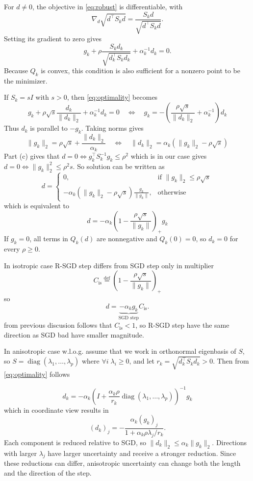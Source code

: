 \documentclass[11pt,a4paper]{article}
\def\eqdef{\overset{\mathrm{def}}{=}}
\begin{document}
For $d\neq 0$, the objective in \eqref{eq:robust} is differentiable, with
\[
    \nabla_d\sqrt{d^\top S_kd}
    =\frac{S_kd}{\sqrt{d^\top S_kd}}.
\]
Setting its gradient to zero gives
\begin{equation}
    g_k+\rho\frac{S_kd_k}{\sqrt{d_k^\top S_kd_k}}
        +\alpha_k^{-1}d_k=0.
    \label{eq:optimality}
\end{equation}
Because $Q_k$ is convex, this condition is also sufficient for a
nonzero point to be the minimizer.

If $S_k=sI$ with $s>0$, then \eqref{eq:optimality} becomes
\[
    g_k+\rho\sqrt{s}\frac{d_k}{\|d_k\|_2}
        +\alpha_k^{-1}d_k=0 
        \quad \iff \quad 
        g_k=-\left(\frac{\rho\sqrt{s}}{\|d_k\|_2}+\alpha_k^{-1}\right)d_k
\]
Thus $d_k$ is parallel to $-g_k$. Taking norms gives
\[
    \|g_k\|_2=\rho\sqrt{s}+\frac{\|d_k\|_2}{\alpha_k}
    \quad \iff \quad
    \|d_k\|_2 = \alpha_k\left( \|g_k\|_2 - \rho\sqrt{s} \right)
\]
Part (c) gives that $d = 0 \iff g_k^\top S_k^{-1}g_k \le \rho^2$ which is in our case gives $d = 0 \iff \|g_k\|^2_2 \le \rho^2s$. So solution can be written as
\[
    d = \begin{cases}
		0, & \text{if $\|g_k\|_2 \le \rho\sqrt{s}$}\\
        -\alpha_k\left( \|g_k\|_2 - \rho\sqrt{s} \right)\frac{g_k}{\|g_k\|}, & \text{otherwise}
	\end{cases}
\]
which is equivalent to
\[
d = -\alpha_k\left( 1 - \frac{\rho\sqrt{s}}{\|g_k\|} \right)_{+}g_k
\]
If $g_k=0$, all terms in $Q_k(d)$ are nonnegative and $Q_k(0)=0$,
so $d_k=0$ for every $\rho\geq 0$.

In isotropic case R-SGD step differs from SGD step only in multiplier 
\[
C_{\text{is}} \eqdef \left( 1 - \frac{\rho\sqrt{s}}{\|g_k\|} \right)_{+}
\]
so 
\[
d = \underbrace{-\alpha_k g_k}_\text{SGD step} C_{\text{is}}.
\]
from previous discusion follows that $C_{\text{is}} < 1$, so R-SGD step have the same direction as SGD bad have smaller magnitude. 

In anisotropic case w.l.o.g. assume that we work in orthonormal eigenbasis of $S$, so $S = \operatorname{diag}(\lambda_1, \ldots, \lambda_p)$ where $\forall i \; \lambda_i \ge 0$, and let $r_k=\sqrt{d_k^\top S_kd_k}>0$. Then from \eqref{eq:optimality} follows 

\[
d_k=-\alpha_k
        \left(I+\frac{\alpha_k\rho}{r_k}\operatorname{diag}(\lambda_1, \ldots, \lambda_p)\right)^{-1}g_k
\]
which in coordinate view results in
\[
    (d_k)_j=
    -\frac{\alpha_k(g_k)_j}
           {1+\alpha_k\rho\lambda_j/r_k}.
\]
Each component is reduced relative to SGD, so
$\|d_k\|_2\leq\alpha_k\|g_k\|_2$. Directions with larger
$\lambda_j$ have larger uncertainty and receive a stronger reduction.
Since these reductions can differ, anisotropic uncertainty can change
both the length and the direction of the step.
\end{document}
